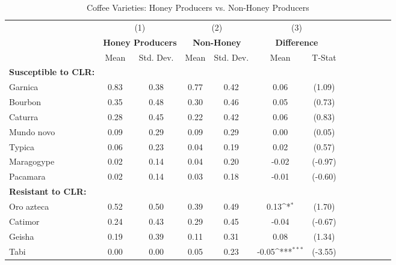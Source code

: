 \begin{table}[htbp]\centering \small
\def\sym#1{\ifmmode^{#1}\else\(^{#1}\)\fi}
\caption{Coffee Varieties: Honey Producers vs. Non-Honey Producers \label{varietals}}
\begin{tabular}{l*{3}{cccc}}
\toprule
                &\multicolumn{2}{c}{(1)}&\multicolumn{2}{c}{(2)}&\multicolumn{2}{c}{(3)}     \\
                &\multicolumn{2}{c}{\textbf{Honey Producers}}&\multicolumn{2}{c}{\textbf{  Non-Honey  }}&\multicolumn{2}{c}{\textbf{Difference}}\\
                &     Mean&Std. Dev.&     Mean&Std. Dev.&     Mean         &   T-Stat\\
\midrule
\textbf{  Susceptible to CLR:}&         &         &         &         &                  &         \\
\addlinespace
Garnica         &     0.83&     0.38&     0.77&     0.42&     0.06         &   (1.09)\\
\addlinespace
Bourbon         &     0.35&     0.48&     0.30&     0.46&     0.05         &   (0.73)\\
\addlinespace
Caturra         &     0.28&     0.45&     0.22&     0.42&     0.06         &   (0.83)\\
\addlinespace
Mundo novo      &     0.09&     0.29&     0.09&     0.29&     0.00         &   (0.05)\\
\addlinespace
Typica          &     0.06&     0.23&     0.04&     0.19&     0.02         &   (0.57)\\
\addlinespace
Maragogype      &     0.02&     0.14&     0.04&     0.20&    -0.02         &  (-0.97)\\
\addlinespace
Pacamara        &     0.02&     0.14&     0.03&     0.18&    -0.01         &  (-0.60)\\
\addlinespace
\textbf{  Resistant to CLR:}&         &         &         &         &                  &         \\
\addlinespace
Oro azteca      &     0.52&     0.50&     0.39&     0.49&     0.13\sym{*}  &   (1.70)\\
\addlinespace
Catimor         &     0.24&     0.43&     0.29&     0.45&    -0.04         &  (-0.67)\\
\addlinespace
Geisha          &     0.19&     0.39&     0.11&     0.31&     0.08         &   (1.34)\\
\addlinespace
Tabi            &     0.00&     0.00&     0.05&     0.23&    -0.05\sym{***}&  (-3.55)\\

\end{tabular}
\end{table}
